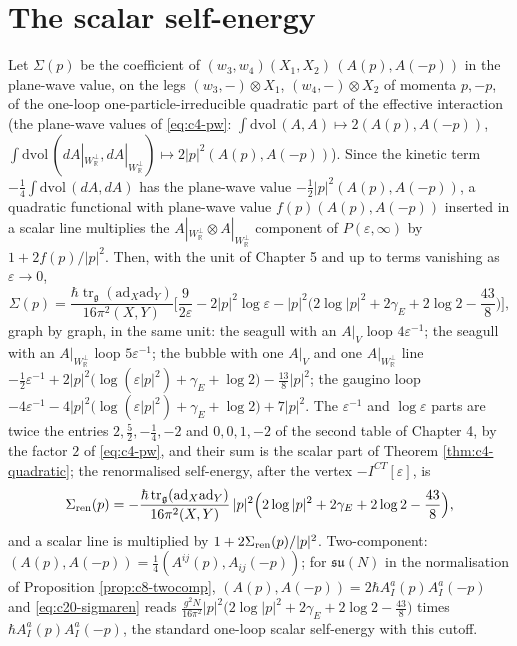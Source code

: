 \section{The scalar self-energy}

\begin{proposition}
\label{prop:c20-selfenergy}
Let $\Sigma(p)$ be the coefficient of $(w_3,w_4)(X_1,X_2)\,(A(p),A(-p))$ in the plane-wave value, on the legs $(w_3,-)\otimes X_1$, $(w_4,-)\otimes X_2$ of momenta $p,-p$, of the one-loop one-particle-irreducible quadratic part of the effective interaction (the plane-wave values of \eqref{eq:c4-pw}: $\int\mathrm{dvol}\,(A,A)\mapsto2(A(p),A(-p))$, $\int\mathrm{dvol}\,(dA|_{W_{\mathbb R}^\perp},dA|_{W_{\mathbb R}^\perp})\mapsto2|p|^2(A(p),A(-p))$). Since the kinetic term $-\tfrac14\int\mathrm{dvol}\,(dA,dA)$ has the plane-wave value $-\tfrac12|p|^2(A(p),A(-p))$, a quadratic functional with plane-wave value $f(p)(A(p),A(-p))$ inserted in a scalar line multiplies the $A|_{W_{\mathbb R}^\perp}\otimes A|_{W_{\mathbb R}^\perp}$ component of $P(\varepsilon,\infty)$ by $1+2f(p)/|p|^2$. Then, with the unit of Chapter 5 and up to terms vanishing as $\varepsilon\to0$,
\begin{equation}
\Sigma(p)=\frac{\hbar\operatorname{tr}_{\mathfrak g}(\mathrm{ad}_X\mathrm{ad}_Y)}{16\pi^2(X,Y)}\Big[\frac{9}{2\varepsilon}-2|p|^2\log\varepsilon-|p|^2\Big(2\log|p|^2+2\gamma_E+2\log2-\frac{43}8\Big)\Big],
\label{eq:c20-sigma}
\end{equation}
graph by graph, in the same unit: the seagull with an $A|_V$ loop $4\varepsilon^{-1}$; the seagull with an $A|_{W_{\mathbb R}^\perp}$ loop $5\varepsilon^{-1}$; the bubble with one $A|_V$ and one $A|_{W_{\mathbb R}^\perp}$ line $-\tfrac12\varepsilon^{-1}+2|p|^2\big(\log(\varepsilon|p|^2)+\gamma_E+\log2\big)-\tfrac{13}8|p|^2$; the gaugino loop $-4\varepsilon^{-1}-4|p|^2\big(\log(\varepsilon|p|^2)+\gamma_E+\log2\big)+7|p|^2$. The $\varepsilon^{-1}$ and $\log\varepsilon$ parts are twice the entries $2,\tfrac52,-\tfrac14,-2$ and $0,0,1,-2$ of the second table of Chapter 4, by the factor $2$ of \eqref{eq:c4-pw}, and their sum is the scalar part of Theorem \ref{thm:c4-quadratic}; the renormalised self-energy, after the vertex $-I^{CT}[\varepsilon]$, is
\begin{equation}
\Sigma_{\rm ren}(p)=-\frac{\hbar\operatorname{tr}_{\mathfrak g}(\mathrm{ad}_X\mathrm{ad}_Y)}{16\pi^2(X,Y)}\,|p|^2\Big(2\log|p|^2+2\gamma_E+2\log2-\frac{43}8\Big),
\label{eq:c20-sigmaren}
\end{equation}
and a scalar line is multiplied by $1+2\Sigma_{\rm ren}(p)/|p|^2$. Two-component: $(A(p),A(-p))=\tfrac14(A^{ij}(p),A_{ij}(-p))$; for $\mathfrak{su}(N)$ in the normalisation of Proposition \ref{prop:c8-twocomp}, $(A(p),A(-p))=2\hbar A^a_I(p)A^a_I(-p)$ and \eqref{eq:c20-sigmaren} reads $\frac{g^2N}{16\pi^2}|p|^2\big(2\log|p|^2+2\gamma_E+2\log2-\tfrac{43}8\big)$ times $\hbar A^a_I(p)A^a_I(-p)$, the standard one-loop scalar self-energy with this cutoff.
\end{proposition}

